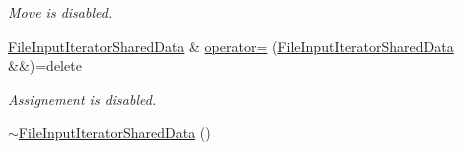 \begin{DoxyCompactItemize}
\begin{DoxyCompactList}\small\item\em Move is disabled. \end{DoxyCompactList}\item 
\hyperlink{class_mdt_1_1_plain_text_1_1_file_input_iterator_shared_data}{File\+Input\+Iterator\+Shared\+Data} \& \hyperlink{class_mdt_1_1_plain_text_1_1_file_input_iterator_shared_data_a545a229a11409c6601525900cbf75889}{operator=} (\hyperlink{class_mdt_1_1_plain_text_1_1_file_input_iterator_shared_data}{File\+Input\+Iterator\+Shared\+Data} \&\&)=delete\hypertarget{class_mdt_1_1_plain_text_1_1_file_input_iterator_shared_data_a545a229a11409c6601525900cbf75889}{}\label{class_mdt_1_1_plain_text_1_1_file_input_iterator_shared_data_a545a229a11409c6601525900cbf75889}

\begin{DoxyCompactList}\small\item\em Assignement is disabled. \end{DoxyCompactList}\item 
\hyperlink{class_mdt_1_1_plain_text_1_1_file_input_iterator_shared_data_a5ea699bdb5e6a72c06054e90138a4707}{$\sim$\+File\+Input\+Iterator\+Shared\+Data} ()\hypertarget{class_mdt_1_1_plain_text_1_1_file_input_iterator_shared_data_a5ea699bdb5e6a72c06054e90138a4707}{}\label{class_mdt_1_1_plain_text_1_1_file_input_iterator_shared_data_a5ea699bdb5e6a72c06054e90138a4707}


\end{DoxyCompactItemize}
